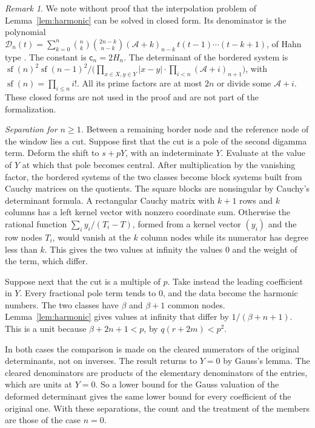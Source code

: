\documentclass[11pt]{amsart}
\theoremstyle{definition}
\theoremstyle{remark}
\newtheorem{remark}[theorem]{Remark}
\numberwithin{equation}{section}
\begin{document}
\begin{remark}\label{rem:hahn}
We note without proof that the interpolation problem of Lemma~\ref{lem:harmonic} can be solved in closed form. Its denominator is the polynomial
$\mathcal D_n(t)=\sum_{k=0}^n\binom nk\binom{2n-k}{n-k}(\mathcal A+k)_{n-k}\,t(t-1)\cdots(t-k+1)$, of Hahn type \cite{KLS}.
The constant is $\mathsf c_n=2H_n$. The determinant of the bordered system is
$\operatorname{sf}(n)^2\operatorname{sf}(n-1)^2\big/\bigl(\prod_{x\in X,y\in Y}|x-y|\cdot\prod_{i<n}(\mathcal A+i)_{n+1}\bigr)$,
with $\operatorname{sf}(n)=\prod_{i\le n}i!$. All its prime factors are at most $2n$ or divide some $\mathcal A+i$. These
closed forms are not used in the proof and are not part of the formalization.
\end{remark}

\emph{Separation for $n\ge1$.} Between a remaining border node and the reference node of the window lies a cut. Suppose
first that the cut is a pole of the second digamma term. Deform the shift to $s+pY$, with an indeterminate $Y$. Evaluate
at the value of $Y$ at which that pole becomes central. After multiplication by the vanishing factor, the bordered systems
of the two classes become block systems built from Cauchy matrices on the quotients. The square blocks are nonsingular
by Cauchy's determinant formula. A rectangular Cauchy matrix with $k+1$ rows and $k$ columns has a left kernel vector
with nonzero coordinate sum. Otherwise the rational function $\sum_iy_i/(T_i-T)$, formed from a kernel vector $(y_i)$
and the row nodes $T_i$, would vanish at the $k$ column nodes while its numerator has degree less than $k$. This gives the
two values at infinity the values $0$ and the weight of the term, which differ.

Suppose next that the cut is a multiple of $p$. Take instead the leading coefficient in $Y$. Every fractional pole term
tends to $0$, and the data become the harmonic numbers. The two classes have $\beta$ and $\beta+1$ common nodes.
Lemma~\ref{lem:harmonic} gives values at infinity that differ by $1/(\beta+n+1)$. This is a unit because $\beta+2n+1<p$, by
$q(r+2m)<p^2$.

In both cases the comparison is made on the cleared numerators of the original determinants, not on inverses. The result
returns to $Y=0$ by Gauss's lemma. The cleared denominators are products of the elementary denominators of the entries,
which are units at $Y=0$. So a lower bound for the Gauss valuation of the deformed determinant gives the same lower bound
for every coefficient of the original one. With these separations, the count and the treatment of the members are those
of the case $n=0$.
\end{document}
